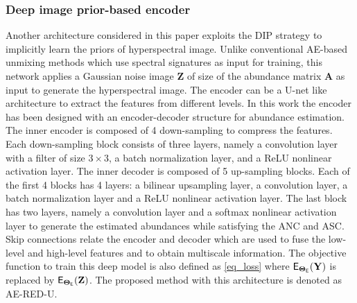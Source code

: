 \documentclass[journal,a4paper]{IEEEtran}
\newcommand{\bfY}{\mathbf{Y}}
\newcommand{\bfZ}{\mathbf{Z}}
\newcommand{\bTheta}{\boldsymbol{\Theta}}
\newcommand{\MATabund}{\mathbf{A}}
\begin{document}
\subsubsection{Deep image prior-based encoder}
Another architecture considered in this paper exploits the DIP strategy  to implicitly learn the priors of hyperspectral image. Unlike conventional AE-based unmixing methods which use spectral signatures as input for training, this network applies a Gaussian noise image $\mathbf{Z}$ of size of the abundance matrix $\MATabund$ as input to generate the hyperspectral image. The encoder can be a U-net like architecture to extract the features from different levels. In this work the encoder has been designed with an encoder-decoder structure for abundance estimation. The inner encoder is composed of 4 down-sampling to compress the features. Each down-sampling block consists of three layers, namely a convolution layer with a filter of size $3\times 3$, a batch normalization layer, and a ReLU nonlinear activation layer. The inner decoder is composed of 5 up-sampling blocks. Each of the first 4 blocks has 4 layers: a bilinear upsampling layer, a convolution layer, a batch normalization layer and a ReLU nonlinear activation layer. The last block has two layers, namely a convolution layer and a softmax nonlinear activation layer to generate the estimated abundances while satisfying the ANC and ASC. Skip connections relate the encoder and decoder which are used to fuse the low-level and high-level features and to obtain  multiscale information. The objective function to train this deep model is also defined as \eqref{eq_loss} where $\mathsf{E}_{\bTheta_{\sf E}}(\bfY)$ is replaced by $\mathsf{E}_{\bTheta_{\sf E}}(\bfZ)$.
The proposed method with this architecture is denoted as AE-RED-U.
\end{document}
